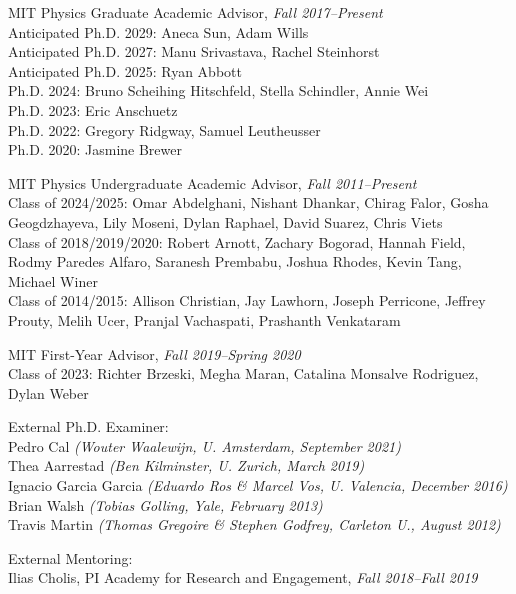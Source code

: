 \item MIT Physics Graduate Academic Advisor, \emph{Fall 2017--Present}
\\ Anticipated Ph.D. 2029: Aneca Sun, Adam Wills
\\ Anticipated Ph.D. 2027: Manu Srivastava, Rachel Steinhorst
\\ Anticipated Ph.D. 2025: Ryan Abbott
\\ Ph.D. 2024: Bruno Scheihing Hitschfeld, Stella Schindler, Annie Wei
\\ Ph.D. 2023: Eric Anschuetz
\\ Ph.D. 2022: Gregory Ridgway, Samuel Leutheusser
\\ Ph.D. 2020: Jasmine Brewer
\item MIT Physics Undergraduate Academic Advisor, \emph{Fall 2011--Present}
\\ Class of 2024/2025: Omar Abdelghani, Nishant Dhankar, Chirag Falor, Gosha Geogdzhayeva, Lily Moseni, Dylan Raphael, David Suarez, Chris Viets
\\ Class of 2018/2019/2020: Robert Arnott, Zachary Bogorad, Hannah Field, Rodmy Paredes Alfaro, Saranesh Prembabu, Joshua Rhodes, Kevin Tang, Michael Winer
\\ Class of 2014/2015: Allison Christian, Jay Lawhorn, Joseph Perricone, Jeffrey Prouty, Melih Ucer, Pranjal Vachaspati, Prashanth Venkataram
\item MIT First-Year Advisor, \emph{Fall 2019--Spring 2020}
\\ Class of 2023: Richter Brzeski, Megha Maran, Catalina Monsalve Rodriguez, Dylan Weber

\item External Ph.D. Examiner:
\\ Pedro Cal \textit{(Wouter Waalewijn, U. Amsterdam, September 2021)}
\\ Thea Aarrestad \textit{(Ben Kilminster, U. Zurich, March 2019)}
\\ Ignacio Garcia Garcia \textit{(Eduardo Ros \& Marcel Vos, U. Valencia, December 2016)}
\\ Brian Walsh \textit{(Tobias Golling, Yale, February 2013)}
\\ Travis Martin \textit{(Thomas Gregoire \& Stephen Godfrey, Carleton U., August 2012)}

\item External Mentoring:
\\ Ilias Cholis, PI Academy for Research and Engagement, \emph{Fall 2018--Fall 2019}

\el
